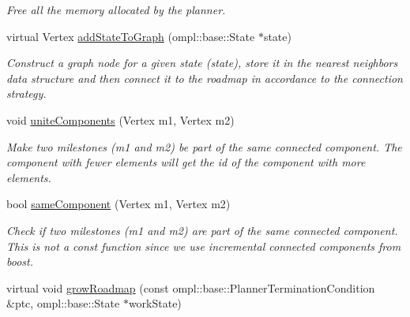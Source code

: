 \begin{DoxyCompactItemize}
\begin{DoxyCompactList}\small\item\em \-Free all the memory allocated by the planner. \end{DoxyCompactList}\item 
\hypertarget{class_f_i_r_m_aec36e02fd978f7ed5a2de1ad23593341}{virtual \-Vertex \hyperlink{class_f_i_r_m_aec36e02fd978f7ed5a2de1ad23593341}{add\-State\-To\-Graph} (ompl\-::base\-::\-State $\ast$state)}\label{class_f_i_r_m_aec36e02fd978f7ed5a2de1ad23593341}

\begin{DoxyCompactList}\small\item\em \-Construct a graph node for a given state ({\itshape state\/}), store it in the nearest neighbors data structure and then connect it to the roadmap in accordance to the connection strategy. \end{DoxyCompactList}\item 
\hypertarget{class_f_i_r_m_a34535f25e4f3fb645fb65d57e3faf01b}{void \hyperlink{class_f_i_r_m_a34535f25e4f3fb645fb65d57e3faf01b}{unite\-Components} (\-Vertex m1, \-Vertex m2)}\label{class_f_i_r_m_a34535f25e4f3fb645fb65d57e3faf01b}

\begin{DoxyCompactList}\small\item\em \-Make two milestones ({\itshape m1\/} and {\itshape m2\/}) be part of the same connected component. \-The component with fewer elements will get the id of the component with more elements. \end{DoxyCompactList}\item 
\hypertarget{class_f_i_r_m_a2045f113f0755ae8eeac2c35c7c08d41}{bool \hyperlink{class_f_i_r_m_a2045f113f0755ae8eeac2c35c7c08d41}{same\-Component} (\-Vertex m1, \-Vertex m2)}\label{class_f_i_r_m_a2045f113f0755ae8eeac2c35c7c08d41}

\begin{DoxyCompactList}\small\item\em \-Check if two milestones ({\itshape m1\/} and {\itshape m2\/}) are part of the same connected component. \-This is not a const function since we use incremental connected components from boost. \end{DoxyCompactList}\item 
\hypertarget{class_f_i_r_m_a4ffee3e504973b2f2a37b6b40c1cd214}{virtual void \hyperlink{class_f_i_r_m_a4ffee3e504973b2f2a37b6b40c1cd214}{grow\-Roadmap} (const ompl\-::base\-::\-Planner\-Termination\-Condition \&ptc, ompl\-::base\-::\-State $\ast$work\-State)}\label{class_f_i_r_m_a4ffee3e504973b2f2a37b6b40c1cd214}


\end{DoxyCompactItemize}
